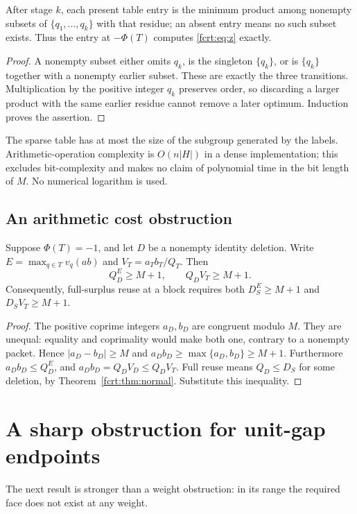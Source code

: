 \begin{proposition}
After stage \(k\), each present table entry is the minimum product among
nonempty subsets of \(\{q_1,\ldots,q_k\}\) with that residue; an absent
entry means no such subset exists. Thus the entry at \(-\Phi(T)\) computes
\eqref{fcrt:eq:z} exactly.
\end{proposition}
\begin{proof}
A nonempty subset either omits \(q_k\), is the singleton \(\{q_k\}\), or
is \(\{q_k\}\) together with a nonempty earlier subset. These are exactly
the three transitions. Multiplication by the positive integer \(q_k\)
preserves order, so discarding a larger product with the same earlier residue
cannot remove a later optimum. Induction proves the assertion.
\end{proof}
The sparse table has at most the size of the subgroup generated by the
labels. Arithmetic-operation complexity is \(O(n|H|)\) in a dense
implementation; this excludes bit-complexity and makes no claim of polynomial
time in the bit length of \(M\). No numerical logarithm is used.

\subsection{An arithmetic cost obstruction}
\begin{proposition}\label{fcrt:prop:cost}
Suppose \(\Phi(T)=-1\), and let \(D\) be a nonempty identity deletion.
Write \(E=\max_{q\in T}v_q(ab)\) and
\(V_T=a_Tb_T/Q_T\). Then
\[
 Q_D^E\ge M+1,\qquad Q_DV_T\ge M+1.
\]
Consequently, full-surplus reuse at a block requires both
\(D_S^E\ge M+1\) and \(D_SV_T\ge M+1\).
\end{proposition}
\begin{proof}
The positive coprime integers \(a_D,b_D\) are congruent modulo \(M\).
They are unequal: equality and coprimality would make both one, contrary to
a nonempty packet. Hence \(|a_D-b_D|\ge M\) and
\(a_Db_D\ge\max\{a_D,b_D\}\ge M+1\).
Furthermore \(a_Db_D\le Q_D^E\), and
\(a_Db_D=Q_DV_D\le Q_DV_T\).
Full reuse means \(Q_D\le D_S\) for some deletion, by
Theorem~\ref{fcrt:thm:normal}. Substitute this inequality.
\end{proof}

\section{A sharp obstruction for unit-gap endpoints}
The next result is stronger than a weight obstruction: in its range the
required face does not exist at any weight.

